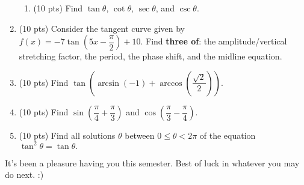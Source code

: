 \documentclass{handout}
\begin{document}
\begin{enumerate}
\begin{enumerate}
      \item (10 pts) Find \(\tan \theta\), \(\cot \theta\), \(\sec \theta\), and \(\csc \theta\).
        
        \vspace{15em}
    \end{enumerate}

    \newpage

  \item (10 pts) Consider the tangent curve given by \(f(x) = -7 \tan\left(5x - \dfrac{\pi}{2}\right) + 10.\) Find \textbf{three of}: the amplitude/vertical stretching factor, the period, the phase shift, and the midline equation.

    \vspace{25em}

  \item (10 pts) Find \(\tan\left(\arcsin(-1) + \arccos\left(\dfrac{\sqrt2}2\right)\right).\)

    \newpage
  \item (10 pts) Find \(\sin\left(\dfrac{\pi}{4} + \dfrac{\pi}{3}\right)\) and \(\cos\left(\dfrac{\pi}{3} - \dfrac{\pi}{4}\right).\)

    \vspace{20em}
  \item (10 pts) Find all solutions \(\theta\) between \(0 \leq \theta < 2\pi\) of the equation \(\tan^2 \theta = \tan \theta.\)
\end{enumerate}

\vspace{30em}

It's been a pleasure having you this semester. Best of luck in whatever you may do next. :)
\end{document}
